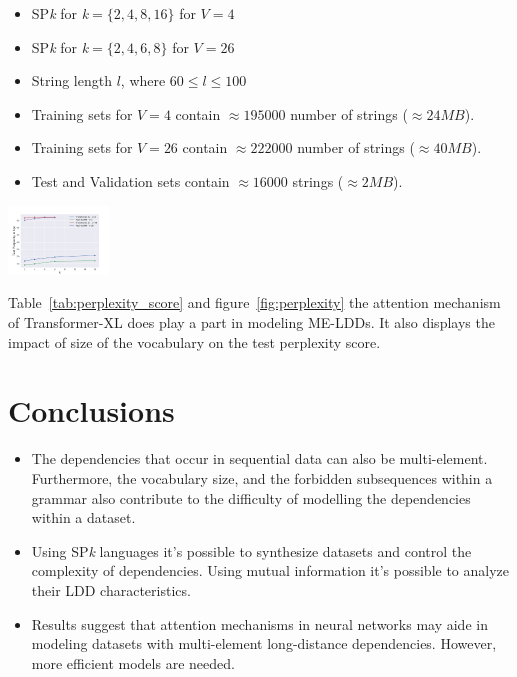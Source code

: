 \documentclass[a0,portrait]{a0poster}
\begin{document}
\begin{multicols}{2}
\begin{multicols}{2}
\begin{itemize}
    \item SP\emph{k} for \emph{k}${=}\{2,4,8,16\}$ for $V{=}4$
    \item SP\emph{k} for \emph{k}${=}\{2,4,6,8\}$ for $V{=}26$
    \item String length $l$, where $60 \leq l \leq{100}$
    \item Training sets for $V{=}4$ contain ${\approx} 195000$ number of strings (${\approx}24MB$). 
    \item Training sets for $V{=}26$ contain ${\approx} 222000$ number of strings (${\approx}40MB$).
    \item Test and Validation sets contain ${\approx} 16000$ strings (${\approx}2MB$).
\end{itemize}
\columnbreak
\begin{center}
\includegraphics[width=0.2\textwidth]{perplexity.png}
\label{fig:perplexity}
\end{center}\vspace{1cm}
\end{multicols}

Table~\ref{tab:perplexity_score} and figure~\ref{fig:perplexity} the attention mechanism of Transformer-XL does play a part in modeling ME-LDDs. It also displays the impact of size of the vocabulary on the test perplexity score. 


\color{tudLogoColor}

\section*{Conclusions}

\color{black}

\begin{itemize}
\item The dependencies that occur in sequential data can also be multi-element. Furthermore, the vocabulary size, and the forbidden subsequences within a grammar also contribute to the difficulty of modelling the dependencies within a dataset.
\item Using SP\emph{k} languages it's possible to synthesize datasets and control the complexity of dependencies. Using mutual information it's possible to analyze their LDD characteristics.
\item Results suggest that attention mechanisms in neural networks may aide in modeling datasets with multi-element long-distance dependencies. However, more efficient models are needed.
\end{itemize}


\end{multicols}
\end{document}
